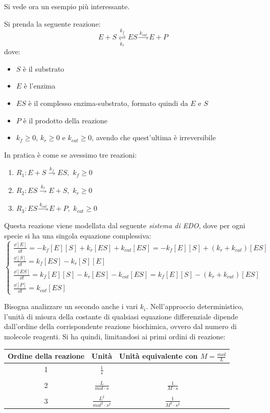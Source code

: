 \documentclass[a4paper,12pt, oneside]{book}
\begin{document}
Si vede ora un esempio più interessante.
\begin{esempio}
  \label{ese:enzsub}
  Si prenda la seguente reazione:
  \[E+S\underset{k_r}{\stackrel{k_f}{\rightleftharpoons}}
    ES\stackrel{k_{cat}}{\rightharpoondown} E+P\]
  dove:
  \begin{itemize}
    \item $S$ è il substrato
    \item $E$ è l'enzima
    \item $ES$ è il complesso enzima-substrato, formato quindi da $E$ e $S$
    \item $P$ è il prodotto della reazione
    \item $k_f\geq 0$, $k_r\geq 0$ e $k_{cat}\geq 0$, avendo che quest'ultima è
    irreversibile 
  \end{itemize}
  In pratica è come se avessimo tre reazioni:
  \begin{enumerate}
    \item $R_1:E+S\stackrel{k_{f}}{\rightharpoondown} ES,\,\,k_f\geq 0$
    \item $R_2:ES\stackrel{k_{r}}{\rightharpoondown} E+S,\,\,k_r\geq 0$
    \item $R_3:ES\stackrel{k_{cat}}{\rightharpoondown} E+P,\,\,k_{cat}\geq 0$
  \end{enumerate}
  Questa reazione viene modellata dal seguente \textit{sistema di EDO}, dove per
  ogni specie si ha una singola equazione complessiva:
  \[
    \begin{cases}
      \frac{\dd{[E]}}{\dd{t}}=-k_f[E][S]+k_r[ES]+k_{cat}[ES]=- k_f[E][S]+
      (k_{r}+k_{cat})[ES]\\
      \frac{\dd{[S]}}{\dd{t}}=k_{f}[ES]-k_r[S][E]\\
      \frac{\dd{[ES]}}{\dd{t}}=k_f[E][S]-k_r[ES]-k_{cat}[ES]=k_f[E][S]-
      (k_r+k_{cat})[ES]\\
      \frac{\dd{[P]}}{\dd{t}}=k_{cat}[ES]
    \end{cases}
  \]
  
\end{esempio}
Bisogna analizzare un secondo anche i vari $k_i$. Nell'approccio deterministico,
l'unità di misura della costante di qualsiasi equazione differenziale dipende
dall'ordine della corrispondente reazione biochimica, ovvero dal numero di
molecole reagenti. Si ha quindi, limitandosi ai primi ordini di reazione:
\begin{table}[H]
  \centering
  \begin{tabular}{c|c|c}
    Ordine della reazione& Unità&Unità equivalente con $M=\frac{mol}{L}$\\
    \hline
    1 & $\frac{1}{s}$ & \\
                         &&\\
    2 & $\frac{L}{mol\cdot s}$ & $\frac{1}{M\cdot s}$\\
                         &&\\
    3 & $\frac{L^2}{mol^2\cdot s^2}$ & $\frac{1}{M^2\cdot s^2}$
  \end{tabular}
\end{table}
\end{document}
